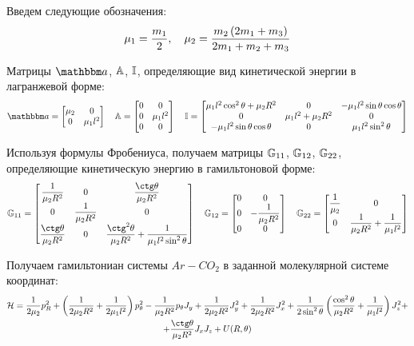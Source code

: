 Введем следующие обозначения:
\vverh
\begin{gather}
	\mu_1 = \frac{m_1}{2}, \quad 
	\mu_2 = \frac{m_2 \left( 2 m_1 + m_3 \right)}{2 m_1 + m_2 + m_3} \notag
\end{gather}

Матрицы $\bba$, $\mathbb{A}$, $\mathbb{I}$, определяющие вид кинетической энергии в лагранжевой форме: 
\vverh
\begin{gather}
	\bba =
	\begin{bmatrix}
		\mu_2 & 0 \\
		0 & \mu_1 l^2
	\end{bmatrix} \quad 
	\bbA = 
	\begin{bmatrix}
		0 & 0 \\
		0 & \mu_1 l^2 \\
		0 & 0 
	\end{bmatrix} \quad
	\bbI = 
	\begin{bmatrix}
		\mu_1 l^2 \cos^2 \theta + \mu_2 R^2 & 0 & -\mu_1 l^2 \sin \theta \cos \theta \\
		0 & \mu_1 l^2 + \mu_2 R^2 & 0 \\
		- \mu_1 l^2 \sin \theta \cos \theta & 0 & \mu_1 l^2 \sin^2 \theta
	\end{bmatrix} \notag
\end{gather}

Используя формулы Фробениуса, получаем матрицы $\mathbb{G}_{11}$, $\mathbb{G}_{12}$, $\mathbb{G}_{22}$, определяющие кинетическую энергию в гамильтоновой форме:
\vverh
\begin{gather}
	\bbG_{11} =
	\begin{bmatrix}
		\dfrac{1}{\mu_2 R^2} & 0 & \dfrac{\ctg \theta}{\mu_2 R^2} \\
		0 & \dfrac{1}{\mu_2 R^2} & 0 \\
		\dfrac{\ctg \theta}{\mu_2 R^2} & 0 & \dfrac{\ctg^2 \theta}{\mu_2 R^2} + \dfrac{1}{\mu_1 l^2 \sin^2 \theta}
	\end{bmatrix} \quad
	\bbG_{12} =
	\begin{bmatrix}
		0 & 0 \\
		0 & - \dfrac{1}{\mu_2 R^2} \\
		0 & 0
	\end{bmatrix} \quad 
	\bbG_{22} = 
	\begin{bmatrix}
		\dfrac{1}{\mu_2} & 0 \\
		0 & \dfrac{1}{\mu_2 R^2} + \dfrac{1}{\mu_1 l^2}
	\end{bmatrix} \notag
\end{gather}

Получаем гамильтониан системы $Ar-CO_2$ в заданной молекулярной системе координат:
\begin{gather}
\mH = \frac{1}{2 \mu_2} p_R^2 + \lb \frac{1}{2 \mu_2 R^2} + \frac{1}{2 \mu_1 l^2} \rb p_\theta^2 - \frac{1}{\mu_2 R^2} p_\theta J_y + \frac{1}{2 \mu_2 R^2} J_y^2 + \frac{1}{2 \mu_2 R^2} J_x^2 + \frac{1}{2 \sin^2 \theta} \lb \frac{\cos^2 \theta}{\mu_2 R^2} + \frac{1}{\mu_1 l^2} \rb J_z^2 + \notag \\
+ \frac{\ctg \theta}{\mu_2 R^2} J_x J_z + U(R, \theta) \notag
\end{gather}



